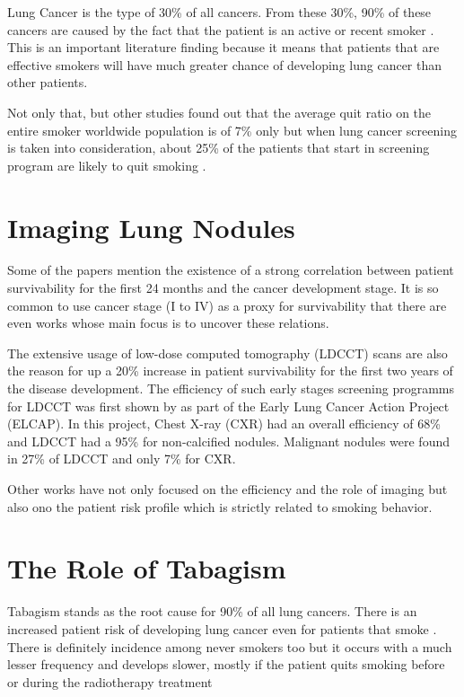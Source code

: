 Lung Cancer is the type of 30\% of all cancers. From these 30\%, 90\% of these cancers are  caused by the fact that the patient is an active or recent smoker \cite{jaklitsch2012}\cite{nccn2019}\cite{roberts2013}. This is an important literature finding because it means that patients that are effective smokers will have much greater chance of developing lung cancer than other patients.

Not only that, but other studies found out that the average quit ratio on the entire smoker worldwide population is of 7\% only but when lung  cancer screening is taken into consideration, about 25\% of the patients that start in screening program are likely to quit smoking \cite{fox2003}\cite{aalst2010}. %

\section{Imaging Lung Nodules}

Some of the papers mention the existence of a strong correlation between patient survivability for the first 24 months and the cancer development stage. It is so common to use cancer stage (I to IV) as a proxy for survivability that there are even works whose main focus is to uncover these relations\cite{roberts2013}\cite{fox2003}.

The extensive usage of low-dose computed tomography (LDCCT) scans are also the reason for up a 20\% increase in patient survivability for the first two years of the disease development\cite{fox2003}\cite{macredmond2006}\cite{mountain2008}\cite{jaklitsch2012}. The efficiency of such early stages screening programms for LDCCT was first shown by  as part of the Early Lung Cancer Action  Project (ELCAP). In this project, Chest X-ray (CXR) had an overall efficiency of 68\% and LDCCT had a 95\% for non-calcified nodules. Malignant nodules were found in 27\% of LDCCT and only 7\% for CXR. 

Other works have not only focused on the efficiency and the role of imaging but also ono the patient risk profile which is strictly related to smoking behavior.

\section{The Role of Tabagism}

Tabagism stands as the root cause for 90\% of all lung cancers. There is an increased patient risk of developing lung cancer even for patients that smoke \cite{ostroff2001}\cite{aalst2010}\cite{aalst2011}. There is definitely incidence among never smokers too but it occurs with a much lesser frequency and develops slower, mostly if the patient quits smoking before or during the radiotherapy treatment \cite{fox2003}\cite{rivera2016}

